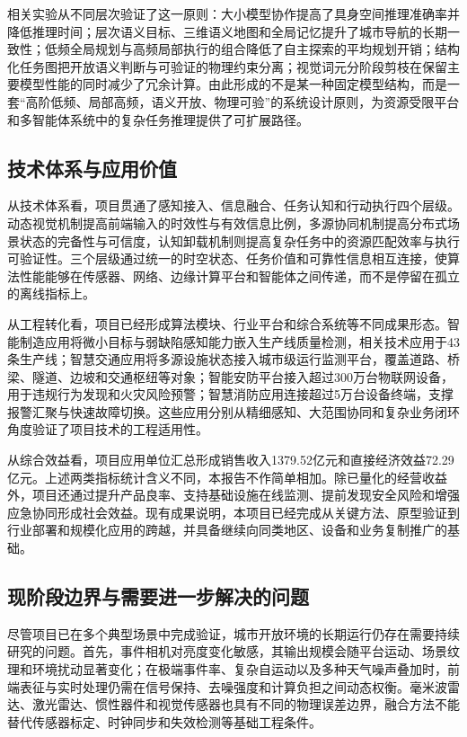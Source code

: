 相关实验从不同层次验证了这一原则：大小模型协作提高了具身空间推理准确率并降低推理时间；层次语义目标、三维语义地图和全局记忆提升了城市导航的长期一致性；低频全局规划与高频局部执行的组合降低了自主探索的平均规划开销；结构化任务图把开放语义判断与可验证的物理约束分离；视觉词元分阶段剪枝在保留主要模型性能的同时减少了冗余计算。由此形成的不是某一种固定模型结构，而是一套“高阶低频、局部高频，语义开放、物理可验”的系统设计原则，为资源受限平台和多智能体系统中的复杂任务推理提供了可扩展路径。

\subsection{技术体系与应用价值}

从技术体系看，项目贯通了感知接入、信息融合、任务认知和行动执行四个层级。动态视觉机制提高前端输入的时效性与有效信息比例，多源协同机制提高分布式场景状态的完备性与可信度，认知卸载机制则提高复杂任务中的资源匹配效率与执行可验证性。三个层级通过统一的时空状态、任务价值和可靠性信息相互连接，使算法性能能够在传感器、网络、边缘计算平台和智能体之间传递，而不是停留在孤立的离线指标上。

从工程转化看，项目已经形成算法模块、行业平台和综合系统等不同成果形态。智能制造应用将微小目标与弱缺陷感知能力嵌入生产线质量检测，相关技术应用于43条生产线；智慧交通应用将多源设施状态接入城市级运行监测平台，覆盖道路、桥梁、隧道、边坡和交通枢纽等对象；智能安防平台接入超过300万台物联网设备，用于违规行为发现和火灾风险预警；智慧消防应用连接超过5万台设备终端，支撑报警汇聚与快速故障切换。这些应用分别从精细感知、大范围协同和复杂业务闭环角度验证了项目技术的工程适用性。

从综合效益看，项目应用单位汇总形成销售收入1379.52亿元和直接经济效益72.29亿元。上述两类指标统计含义不同，本报告不作简单相加。除已量化的经营收益外，项目还通过提升产品良率、支持基础设施在线监测、提前发现安全风险和增强应急协同形成社会效益。现有成果说明，本项目已经完成从关键方法、原型验证到行业部署和规模化应用的跨越，并具备继续向同类地区、设备和业务复制推广的基础。

\subsection{现阶段边界与需要进一步解决的问题}

尽管项目已在多个典型场景中完成验证，城市开放环境的长期运行仍存在需要持续研究的问题。首先，事件相机对亮度变化敏感，其输出规模会随平台运动、场景纹理和环境扰动显著变化；在极端事件率、复杂自运动以及多种天气噪声叠加时，前端表征与实时处理仍需在信号保持、去噪强度和计算负担之间动态权衡。毫米波雷达、激光雷达、惯性器件和视觉传感器也具有不同的物理误差边界，融合方法不能替代传感器标定、时钟同步和失效检测等基础工程条件。

